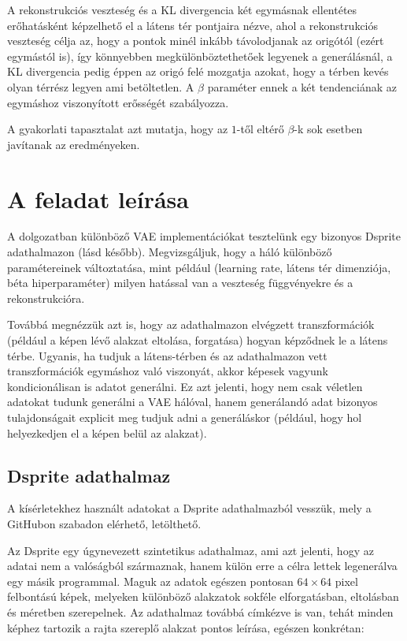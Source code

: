 A rekonstrukciós veszteség és a KL divergencia két egymásnak ellentétes erőhatásként képzelhető el a látens tér pontjaira nézve, ahol a rekonstrukciós veszteség célja az, hogy a pontok minél inkább távolodjanak az origótól (ezért egymástól is), így könnyebben megkülönböztethetőek legyenek a generálásnál, a KL divergencia pedig éppen az origó felé mozgatja azokat, hogy a térben kevés olyan térrész legyen ami betöltetlen. A $\beta$ paraméter ennek a két tendenciának az egymáshoz viszonyított erősségét szabályozza.

A gyakorlati tapasztalat azt mutatja, hogy az $1$-től eltérő $\beta$-k sok esetben javítanak az eredményeken.

\chapter{A feladat leírása}

A dolgozatban különböző VAE implementációkat tesztelünk egy bizonyos Dsprite adathalmazon (lásd később). Megvizsgáljuk, hogy a háló különböző paramétereinek változtatása, mint például (learning rate, látens tér dimenziója, béta hiperparaméter) milyen hatással van a veszteség függvényekre és a rekonstrukcióra.

Továbbá megnézzük azt is, hogy az adathalmazon elvégzett transzformációk (például a képen lévő alakzat eltolása, forgatása) hogyan képződnek le a látens térbe. Ugyanis, ha tudjuk a látens-térben és az adathalmazon vett transzformációk egymáshoz való viszonyát, akkor képesek vagyunk kondicionálisan is adatot generálni. Ez azt jelenti, hogy nem csak véletlen adatokat tudunk generálni a VAE hálóval, hanem generálandó adat bizonyos tulajdonságait explicit meg tudjuk adni a generáláskor (például, hogy hol helyezkedjen el a képen belül az alakzat).

\section{Dsprite adathalmaz}

A kísérletekhez használt adatokat a Dsprite adathalmazból vesszük, mely a GitHubon szabadon elérhető, letölthető.

Az Dsprite egy úgynevezett szintetikus adathalmaz, ami azt jelenti, hogy az adatai nem a valóságból származnak, hanem külön erre a célra lettek legenerálva egy másik programmal. Maguk az adatok egészen pontosan $64\times64$ pixel felbontású képek, melyeken különböző alakzatok sokféle elforgatásban, eltolásban és méretben szerepelnek. Az adathalmaz továbbá címkézve is van, tehát minden képhez tartozik a rajta szereplő alakzat pontos leírása, egészen konkrétan:

